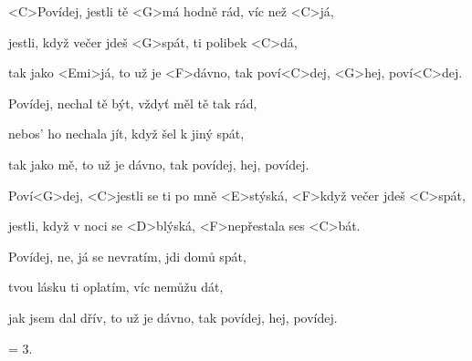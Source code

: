 

\zs
<C>Povídej, jestli tě <G>má hodně rád, víc než <C>já,

jestli, když večer jdeš <G>spát, ti polibek <C>dá,

tak jako <Emi>já, to už je <F>dávno, tak poví<C>dej, <G>hej, poví<C>dej.
\ks

\zs
Povídej, nechal tě být, vždyť měl tě tak rád,

nebos' ho nechala jít, když šel k jiný spát,

tak jako mě, to už je dávno, tak povídej, hej, povídej.
\ks

\zr
Poví<G>dej, <C>jestli se ti po mně <E>stýská, <F>když večer jdeš <C>spát,

jestli, když v noci se <D>blýská, <F>nepřestala ses <C>bát.
\kr

\zs
Povídej, ne, já se nevratím, jdi domů spát,

tvou lásku ti oplatím, víc nemůžu dát,

jak jsem dal dřív, to už je dávno, tak povídej, hej, povídej.
\ks

\zr
\kr

\zs
= 3.
\ks

\kp
